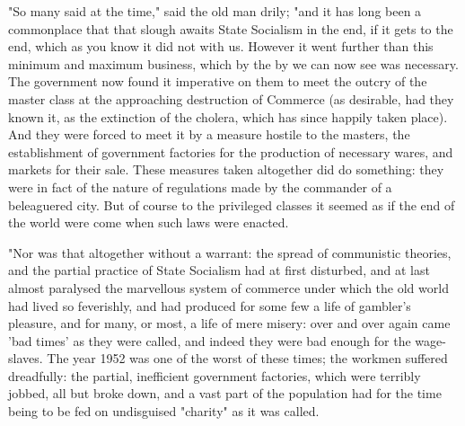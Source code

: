 "So many said at the time," said the old man drily; "and it has long
been a commonplace that that slough awaits State Socialism in the end,
if it gets to the end, which as you know it did not with us. However it
went further than this minimum and maximum business, which by the by we
can now see was necessary. The government now found it imperative on
them to meet the outcry of the master class at the approaching
destruction of Commerce (as desirable, had they known it, as the
extinction of the cholera, which has since happily taken place). And
they were forced to meet it by a measure hostile to the masters, the
establishment of government factories for the production of necessary
wares, and markets for their sale. These measures taken altogether did
do something: they were in fact of the nature of regulations made by the
commander of a beleaguered city. But of course to the privileged classes
it seemed as if the end of the world were come when such laws were
enacted.

"Nor was that altogether without a warrant: the spread of communistic
theories, and the partial practice of State Socialism had at first
disturbed, and at last almost paralysed the marvellous system of
commerce under which the old world had lived so feverishly, and had
produced for some few a life of gambler's pleasure, and for many, or
most, a life of mere misery: over and over again came 'bad times' as
they were called, and indeed they were bad enough for the wage-slaves.
The year 1952 was one of the worst of these times; the workmen suffered
dreadfully: the partial, inefficient government factories, which were
terribly jobbed, all but broke down, and a vast part of the population
had for the time being to be fed on undisguised "charity" as it was
called.


